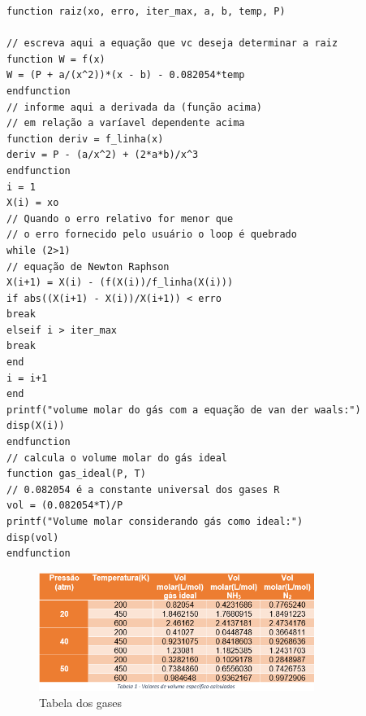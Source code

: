 \begin{verbatim}
function raiz(xo, erro, iter_max, a, b, temp, P)  

// escreva aqui a equação que vc deseja determinar a raiz
function W = f(x) 
W = (P + a/(x^2))*(x - b) - 0.082054*temp
endfunction
// informe aqui a derivada da (função acima)
// em relação a varíavel dependente acima
function deriv = f_linha(x) 
deriv = P - (a/x^2) + (2*a*b)/x^3
endfunction
i = 1
X(i) = xo
// Quando o erro relativo for menor que
// o erro fornecido pelo usuário o loop é quebrado
while (2>1) 
// equação de Newton Raphson
X(i+1) = X(i) - (f(X(i))/f_linha(X(i))) 
if abs((X(i+1) - X(i))/X(i+1)) < erro
break
elseif i > iter_max
break
end
i = i+1
end   
printf("volume molar do gás com a equação de van der waals:")
disp(X(i))   
endfunction
// calcula o volume molar do gás ideal
function gas_ideal(P, T)
// 0.082054 é a constante universal dos gases R
vol = (0.082054*T)/P 
printf("Volume molar considerando gás como ideal:")
disp(vol)
endfunction 
\end{verbatim}

\begin{figure}[H]
	\centering
	\includegraphics[width=0.8\textwidth]{./Imagens/Idealidade/ide1.png}
	\caption{Tabela dos gases}
	\label{fig:OHS1}
\end{figure}